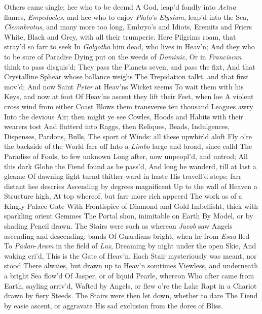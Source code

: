 \documentclass[11pt]{book}
\newcounter {first}
\newcounter {last}
\begin{document}
Others came single; hee who to be deemd 
A God, leap'd fondly into \textit{Aetna} flames, 
\textit{Empedocles}, and hee who to enjoy 
\textit{Plato}'s \textit{Elysium}, leap'd into the Sea, 
\textit{Cleombrotus}, and many more too long, 
Embryo's and Idiots, Eremits and Friers 
White, Black and Grey, with all their trumperie. 
Here Pilgrims roam, that stray'd so farr to seek 
In \textit{Golgotha} him dead, who lives in Heav'n; 
And they who to be sure of Paradise 
Dying put on the weeds of \textit{Dominic}, 
Or in \textit{Franciscan} think to pass disguis'd; 
They pass the Planets seven, and pass the fixt, 
And that Crystalline Sphear whose ballance weighs 
The Trepidation talkt, and that first mov'd; 
And now Saint \textit{Peter} at Heav'ns Wicket seems 
To wait them with his Keys, and now at foot 
Of Heav'ns ascent they lift their Feet, when loe 
A violent cross wind from either Coast 
Blows them transverse ten thousand Leagues awry 
Into the devious Air; then might ye see 
Cowles, Hoods and Habits with their wearers tost 
And flutterd into Raggs, then Reliques, Beads, 
Indulgences, Dispenses, Pardons, Bulls, 
The sport of Winds: all these upwhirld aloft 
Fly o're the backside of the World farr off 
Into a \textit{Limbo} large and broad, since calld 
The Paradise of Fools, to few unknown 
Long after, now unpeopl'd, and untrod; 
All this dark Globe the Fiend found as he pass'd, 
And long he wanderd, till at last a gleame 
Of dawning light turnd thither-ward in haste 
His travell'd steps; farr distant hee descries 
Ascending by degrees magnificent 
Up to the wall of Heaven a Structure high, 
At top whereof, but farr more rich appeerd 
The work as of a Kingly Palace Gate 
With Frontispice of Diamond and Gold 
Imbellisht, thick with sparkling orient Gemmes 
The Portal shon, inimitable on Earth 
By Model, or by shading Pencil drawn. 
The Stairs were such as whereon \textit{Jacob} saw 
Angels ascending and descending, bands 
Of Guardians bright, when he from \textit{Esau} fled 
To \textit{Padan}-\textit{Aram} in the field of \textit{Luz}, 
Dreaming by night under the open Skie, 
And waking cri'd, This is the Gate of Heav'n. 
Each Stair mysteriously was meant, nor stood 
There alwaies, but drawn up to Heav'n somtimes 
Viewless, and underneath a bright Sea flow'd 
Of Jasper, or of liquid Pearle, whereon 
Who after came from Earth, sayling arriv'd, 
Wafted by Angels, or flew o're the Lake 
Rapt in a Chariot drawn by fiery Steeds. 
The Stairs were then let down, whether to dare 
The Fiend by easie ascent, or aggravate 
His sad exclusion from the dores of Bliss. 
\end{document}

